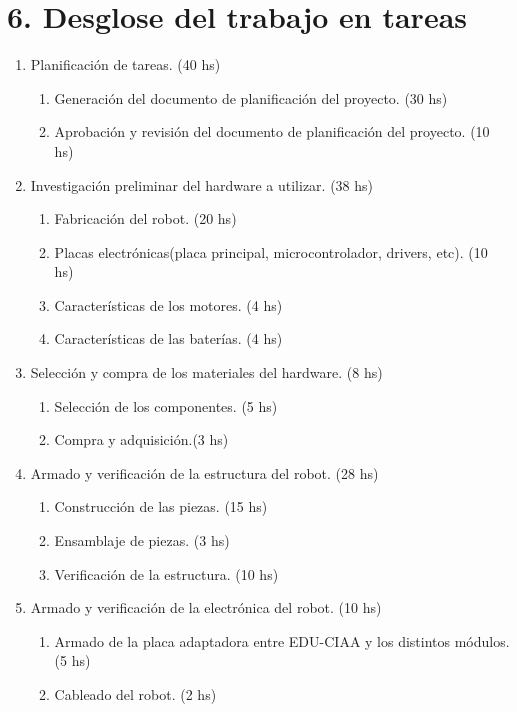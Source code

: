 \documentclass[11pt]{charter}
\begin{document}
\section{6. Desglose del trabajo en tareas}
\label{sec:wbs}
\begin{enumerate}
\item Planificación de tareas. (40 hs)
	\begin{enumerate}
	\item Generación del documento de planificación del proyecto. (30 hs)
	\item Aprobación y revisión del documento de planificación del proyecto. (10 hs)
	\end{enumerate}
\item Investigación preliminar del hardware a utilizar. (38 hs)
	\begin{enumerate}
	\item Fabricación del robot. (20 hs)
	\item Placas electrónicas(placa principal, microcontrolador, drivers, etc). (10 hs)
	\item Características de los motores.  (4 hs)
	\item Características de las baterías. (4 hs)
	\end{enumerate}
\item Selección y compra de los materiales del hardware. (8 hs)
	\begin{enumerate}
	\item Selección de los componentes. (5 hs)
	\item Compra y adquisición.(3 hs)
	\end{enumerate}
\item Armado y verificación de la estructura del robot. (28 hs)
	\begin{enumerate}
	\item Construcción de las piezas. (15 hs)
	\item Ensamblaje de piezas. (3 hs)
	\item Verificación de la estructura. (10 hs)
	\end{enumerate}
\item Armado y verificación de la electrónica del robot. (10 hs)
	\begin{enumerate}
	\item Armado de la placa adaptadora entre EDU-CIAA y los distintos módulos. (5 hs)
	\item Cableado del robot. (2 hs)

\end{enumerate}
\end{enumerate}
\end{document}
